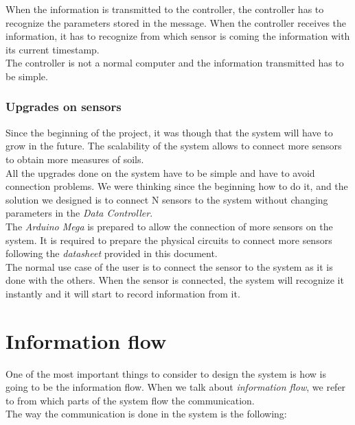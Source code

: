 When the information is transmitted to the controller, the controller has to recognize the parameters stored in the message. When the controller receives the information, it has to recognize from which sensor is coming the information with its current timestamp.\\

The controller is not a normal computer and the information transmitted has to be simple.

\subsubsection{Upgrades on sensors}

Since the beginning of the project, it was though that the system will have to grow in the future. The scalability of the system allows to connect more sensors to obtain more measures of soils.\\

All the upgrades done on the system have to be simple and have to avoid connection problems. We were thinking since the beginning how to do it, and the solution we designed is to connect N sensors to the system without changing parameters in the \textit{Data Controller}.\\

The \textit{Arduino Mega} is prepared to allow the connection of more sensors on the system. It is required to prepare the physical circuits to connect more sensors following the \textit{datasheet} provided in this document.\\

The normal use case of the user is to connect the sensor to the system as it is done with the others. When the sensor is connected, the system will recognize it instantly and it will start to record information from it.

\section{Information flow}

One of the most important things to consider to design the system is how is going to be the information flow. When we talk about \textit{information flow}, we refer to from which parts of the system flow the communication.\\

The way the communication is done in the system is the following:

